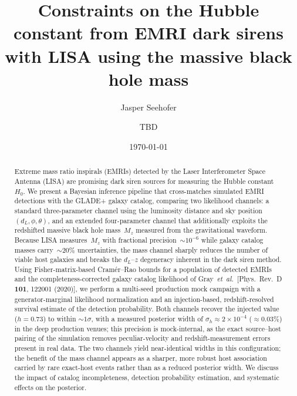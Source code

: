 \documentclass[aps,prd,twocolumn,superscriptaddress,nofootinbib]{revtex4-2}
\newcommand{\HH}{H_0}
\newcommand{\dL}{d_L}
\newcommand{\Mz}{M_z}
\begin{document}
\title{Constraints on the Hubble constant from EMRI dark sirens with LISA using the massive black hole mass}

\author{Jasper Seehofer}

\author{TBD}

\date{\today}

\begin{abstract}
Extreme mass ratio inspirals (EMRIs) detected by the Laser Interferometer
Space Antenna (LISA) are promising dark siren sources for measuring the
Hubble constant~$\HH$.  We present a Bayesian inference pipeline that
cross-matches simulated EMRI detections with the GLADE+ galaxy catalog,
comparing two likelihood channels: a standard three-parameter channel using
the luminosity distance and sky position~$(\dL, \phi, \theta)$, and an
extended four-parameter channel that additionally exploits the redshifted
massive black hole mass~$\Mz$ measured from the gravitational waveform.
Because LISA measures~$\Mz$ with fractional precision~$\sim\!10^{-6}$
while galaxy catalog masses carry~$\sim\!20\%$ uncertainties, the mass
channel sharply reduces the number of viable host galaxies and breaks the
$\dL$--$z$ degeneracy inherent in the dark siren method.
Using Fisher-matrix-based Cram\'er--Rao bounds for a population of
detected EMRIs and the completeness-corrected galaxy catalog likelihood of
Gray~\textit{et~al.}\ [Phys.\ Rev.\ D \textbf{101}, 122001 (2020)],
we perform a multi-seed production mock campaign with a
generator-marginal likelihood normalization and an injection-based,
redshift-resolved survival estimate of the detection probability.
Both channels recover the injected value ($h = 0.73$) to within
$\sim\!1\sigma$, with a measured posterior width of
$\sigma_h \approx 2\times10^{-4}$ ($\approx\!0.03\%$) in the deep
production venues; this precision is mock-internal, as the exact
source--host pairing of the simulation removes peculiar-velocity and
redshift-measurement errors present in real data.  The two channels
yield near-identical widths in this configuration; the benefit of the
mass channel appears as a sharper, more robust host association
carried by rare exact-host events rather than as a reduced posterior
width.  We discuss the impact of catalog incompleteness, detection
probability estimation, and systematic effects on the posterior.
\end{abstract}
\end{document}
